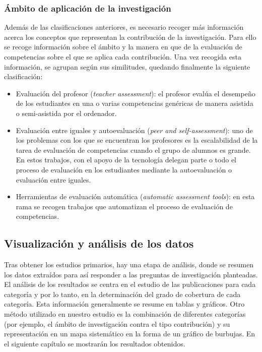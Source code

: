 \subsubsection{Ámbito de aplicación de la investigación}
Además de las clasificaciones anteriores, es necesario recoger más información acerca los conceptos que representan la contribución de la investigación. Para ello se recoge información sobre el ámbito y la manera en que de la evaluación de competencias sobre el que se aplica cada contribución. Una vez recogida esta información, se agrupan según sus similitudes, quedando finalmente la siguiente clasificación:
\begin{itemize}
\item Evaluación del profesor (\emph{teacher assessment}): el profesor evalúa el desempeño de los estudiantes en una o varias competencias genéricas de manera asistida o semi-asistida por el ordenador.
\item Evaluación entre iguales y autoevaluación (\emph{peer and self-assessment}): uno de los problemas con los que se encuentran los profesores es la escalabilidad de la tarea de evaluación de competencias cuando el grupo de alumnos es grande. En estos trabajos, con el apoyo de la tecnología delegan parte o todo el proceso de evaluación en los estudiantes mediante la autoevaluación o evaluación entre iguales.
\item Herramientas de evaluación automática (\emph{automatic assessment tools}): en esta rama se recogen trabajos que automatizan el proceso de evaluación de competencias.
\end{itemize}

\subsection{Visualización y análisis de los datos}
Tras obtener los estudios primarios, hay una etapa de análisis, donde se resumen los datos extraídos para así responder a las preguntas de investigación planteadas. El análisis de los resultados se centra en el estudio de las publicaciones para cada categoría y por lo tanto, en la determinación del grado de cobertura de cada categoría. Esta información generalmente se resume en tablas y gráficos. Otro método utilizado en nuestro estudio es la combinación de diferentes categorías (por ejemplo, el ámbito de investigación contra el tipo contribución) y su representación en un mapa sistemático en la forma de un gráfico de burbujas.
En el siguiente capítulo se mostrarán los resultados obtenidos.

